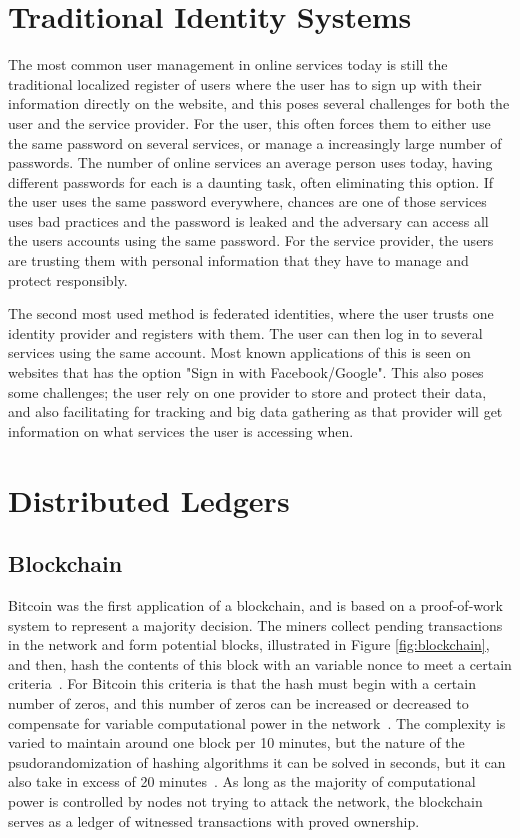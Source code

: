 \section{Traditional Identity Systems}
The most common user management in online services today is still the traditional localized register of users where the user has to sign up with their information directly on the website, and this poses several challenges for both the user and the service provider. For the user, this often forces them to either use the same password on several services, or manage a increasingly large number of passwords. The number of online services an average person uses today, having different passwords for each is a daunting task, often eliminating this option. If the user uses the same password everywhere, chances are one of those services uses bad practices and the password is leaked and the adversary can access all the users accounts using the same password. For the service provider, the users are trusting them with personal information that they have to manage and protect responsibly.

The second most used method is federated identities, where the user trusts one identity provider and registers with them. The user can then log in to several services using the same account. Most known applications of this is seen on websites that has the option "Sign in with Facebook/Google". This also poses some challenges; the user rely on one provider to store and protect their data, and also facilitating for tracking and big data gathering as that provider will get information on what services the user is accessing when.

\section{Distributed Ledgers}
\label{sec:background_dlt}
\subsection{Blockchain}
Bitcoin was the first application of a blockchain, and is based on a proof-of-work system to represent a majority decision. The miners collect pending transactions in the network and form potential blocks, illustrated in Figure \ref{fig:blockchain}, and then, hash the contents of this block with an variable nonce to meet a certain criteria~\cite{bitcoin2008}. For Bitcoin this criteria is that the hash must begin with a certain number of zeros, and this number of zeros can be increased or decreased to compensate for variable computational power in the network~\cite{bitcoin2008}. The complexity is varied to maintain around one block per 10 minutes, but the nature of the psudorandomization of hashing algorithms it can be solved in seconds, but it can also take in excess of 20 minutes~\cite{blockchain_info}. As long as the majority of computational power is controlled by nodes not trying to attack the network, the blockchain serves as a ledger of witnessed transactions with proved ownership.

